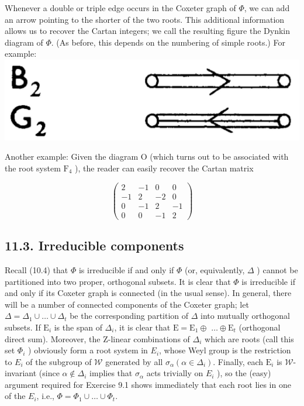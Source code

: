 \documentclass[10pt]{article}
\begin{document}
Whenever a double or triple edge occurs in the Coxeter graph of $\Phi$, we can add an arrow pointing to the shorter of the two roots. This additional information allows us to recover the Cartan integers; we call the resulting figure the Dynkin diagram of $\Phi$. (As before, this depends on the numbering of simple roots.) For example:\\
\includegraphics[max width=\textwidth, center]{2025_06_06_fac2836a92464059da43g-070}

Another example: Given the diagram O (which turns out to be associated with the root system $\mathrm{F}_{4}$ ), the reader can easily recover the Cartan matrix

$$
\left(\begin{array}{rrrr}
2 & -1 & 0 & 0 \\
-1 & 2 & -2 & 0 \\
0 & -1 & 2 & -1 \\
0 & 0 & -1 & 2
\end{array}\right)
$$

\subsection*{11.3. Irreducible components}
Recall (10.4) that $\Phi$ is irreducible if and only if $\Phi$ (or, equivalently, $\Delta$ ) cannot be partitioned into two proper, orthogonal subsets. It is clear that $\Phi$ is irreducible if and only if its Coxeter graph is connected (in the usual sense). In general, there will be a number of connected components of the Coxeter graph; let $\Delta=\Delta_{1} \cup \ldots \cup \Delta_{t}$ be the corresponding partition of $\Delta$ into mutually orthogonal subsets. If $\mathrm{E}_{i}$ is the span of $\Delta_{i}$, it is clear that $\mathrm{E}=\mathrm{E}_{1} \oplus$ $\ldots \oplus \mathrm{E}_{t}$ (orthogonal direct sum). Moreover, the Z-linear combinations of $\Delta_{i}$ which are roots (call this set $\Phi_{i}$ ) obviously form a root system in $E_{i}$, whose Weyl group is the restriction to $E_{i}$ of the subgroup of $\mathscr{W}$ generated by all $\sigma_{\alpha}\left(\alpha \in \Delta_{i}\right)$. Finally, each $\mathrm{E}_{i}$ is $\mathscr{W}$-invariant (since $\alpha \notin \Delta_{i}$ implies that $\sigma_{\alpha}$ acts trivially on $E_{i}$ ), so the (easy) argument required for Exercise 9.1 shows immediately that each root lies in one of the $E_{i}$, i.e., $\Phi=\Phi_{1} \cup \ldots \cup \Phi_{t}$.
\end{document}
